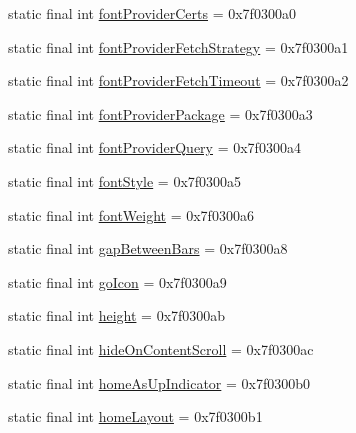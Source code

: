 \begin{DoxyCompactItemize}
\item 
static final int \mbox{\hyperlink{classcom_1_1synnapps_1_1carouselview_1_1_r_1_1attr_a73f16c9f21b4b6997102f21a28c545fe}{font\+Provider\+Certs}} = 0x7f0300a0
\item 
static final int \mbox{\hyperlink{classcom_1_1synnapps_1_1carouselview_1_1_r_1_1attr_ab825c6f7656bf3575e9878b1e89fbba6}{font\+Provider\+Fetch\+Strategy}} = 0x7f0300a1
\item 
static final int \mbox{\hyperlink{classcom_1_1synnapps_1_1carouselview_1_1_r_1_1attr_a9559673f7a51e1ac451c257324b9232e}{font\+Provider\+Fetch\+Timeout}} = 0x7f0300a2
\item 
static final int \mbox{\hyperlink{classcom_1_1synnapps_1_1carouselview_1_1_r_1_1attr_a321c7002a60c1b325e4514c47f9648d9}{font\+Provider\+Package}} = 0x7f0300a3
\item 
static final int \mbox{\hyperlink{classcom_1_1synnapps_1_1carouselview_1_1_r_1_1attr_a9d5e639b42f0a48b96b500ab959d27af}{font\+Provider\+Query}} = 0x7f0300a4
\item 
static final int \mbox{\hyperlink{classcom_1_1synnapps_1_1carouselview_1_1_r_1_1attr_a9263ac9f71bf518936372d1d12085a9f}{font\+Style}} = 0x7f0300a5
\item 
static final int \mbox{\hyperlink{classcom_1_1synnapps_1_1carouselview_1_1_r_1_1attr_abf8f0aae8ed9815d5d9db481da64289c}{font\+Weight}} = 0x7f0300a6
\item 
static final int \mbox{\hyperlink{classcom_1_1synnapps_1_1carouselview_1_1_r_1_1attr_a281997c44e325e42eb0a654bd2e2cb44}{gap\+Between\+Bars}} = 0x7f0300a8
\item 
static final int \mbox{\hyperlink{classcom_1_1synnapps_1_1carouselview_1_1_r_1_1attr_a5c6586238ac9d5e760f5c87fe6306295}{go\+Icon}} = 0x7f0300a9
\item 
static final int \mbox{\hyperlink{classcom_1_1synnapps_1_1carouselview_1_1_r_1_1attr_a4c2a3fa5249ddf4f30cdf94eb4e1293d}{height}} = 0x7f0300ab
\item 
static final int \mbox{\hyperlink{classcom_1_1synnapps_1_1carouselview_1_1_r_1_1attr_ac90de01add651330728ca047ecb262ee}{hide\+On\+Content\+Scroll}} = 0x7f0300ac
\item 
static final int \mbox{\hyperlink{classcom_1_1synnapps_1_1carouselview_1_1_r_1_1attr_a91292f235a4d0a24120c4afa5247a8a1}{home\+As\+Up\+Indicator}} = 0x7f0300b0
\item 
static final int \mbox{\hyperlink{classcom_1_1synnapps_1_1carouselview_1_1_r_1_1attr_a3abed5f1b31e76b6c21520745f5cd4aa}{home\+Layout}} = 0x7f0300b1

\end{DoxyCompactItemize}
